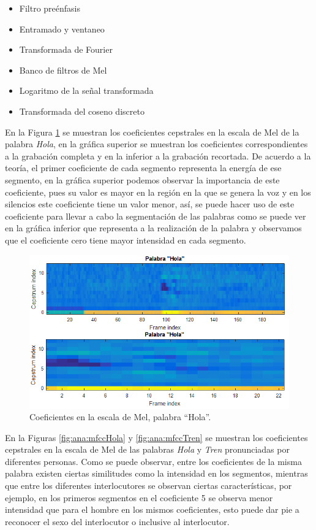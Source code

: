 	\begin{itemize}
	\item	Filtro preénfasis
	\item	Entramado y ventaneo
	\item	Transformada de Fourier
	\item	Banco de filtros de Mel
	\item	Logaritmo de la señal transformada
	\item	Transformada del coseno discreto
	\end{itemize}
	
	En la Figura \ref{fig:ana:HolaRecorte} se muestran los coeficientes cepstrales en la escala de Mel de la palabra \textit{Hola}, en la gráfica superior se muestran los coeficientes correspondientes a la grabación completa y en la inferior a la grabación recortada. De acuerdo a la teoría, el primer coeficiente de cada segmento representa la energía de ese segmento, en la gráfica superior podemos observar la importancia de este coeficiente, pues su valor es mayor en la región en la que se genera la voz y en los silencios este coeficiente tiene un valor menor, así, se puede hacer uso de este coeficiente para llevar a cabo la segmentación de las palabras como se puede ver en la gráfica inferior que representa a la realización de la palabra y observamos que el coeficiente cero tiene mayor intensidad en cada segmento.
	
	 \begin{figure}[H]
			\centering
			\includegraphics[width=0.8\linewidth]{figures/mfccHolaRecorte}
			\caption{Coeficientes en la escala de Mel, palabra ``Hola''.}
			\label{fig:ana:HolaRecorte}
	\end{figure}
	
	En la Figuras \ref{fig:ana:mfccHola} y \ref{fig:ana:mfccTren} se muestran los coeficientes cepstrales en la escala de Mel de las palabras \textit{Hola} y \textit{Tren} pronunciadas por diferentes personas. Como se puede observar, entre los coeficientes de la misma palabra existen ciertas similitudes como la intensidad en los segmentos, mientras que entre los diferentes interlocutores se observan ciertas características, por ejemplo, en los primeros segmentos en el coeficiente 5 se observa menor intensidad que para el hombre en los mismos coeficientes, esto puede dar pie a reconocer el sexo del interlocutor o inclusive al interlocutor.
	
